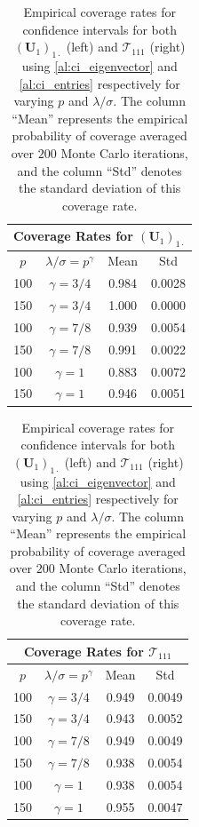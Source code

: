 \documentclass[10pt]{article}
\newcommand{\0}{{\mathbf{0}}}
\newcommand{\1}{{\mathbf{1}}}
\newcommand{\U}{{\mathbf{U}}}
\begin{document}
 \begin{table}[htb]
    \centering
    \begin{tabular}{|c|c | c | c |}
    \hline 
\multicolumn{4}{|c|}{Coverage Rates for $(\U_1)_{1\cdot}$}   \\ [1ex]
\hline 
  $p$ & $ \lambda/\sigma = p^{\gamma}$ & Mean  & Std  \\
  \hline 
  100 & $\gamma = 3/4$ & 0.984 &   0.0028 
\\ 
\hline 
  
 150 & $\gamma =  3/4$ &  1.000  & 0.0000 
 \\
\hline 
  
 100 & $\gamma = 7/8$ & 0.939   & 0.0054 
\\
\hline 
  
 150 & $\gamma = 7/8$ & 0.991
  &   0.0022
 \\
 \hline 
  
 100  & $\gamma = 1$ &  0.883 
&  0.0072 
\\\hline 
  
 150  & $\gamma =  1$ & 0.946  & 0.0051
\\ \hline 
  
\end{tabular} 
\hspace{20pt}
\begin{tabular}{|c|c | c | c |}
      \hline 
\multicolumn{4}{|c|}{Coverage Rates for $\mathcal{T}_{111}$}   \\ [1ex]
\hline 
  $p$ & $ \lambda/\sigma = p^{\gamma}$ & Mean  & Std  \\
  \hline 
  100 & $\gamma = 3/4$ & 0.949 &  0.0049 
\\ 
\hline 
  
 150 & $\gamma =  3/4$ &  0.943 &   0.0052 
\\
\hline 
  
 100 & $\gamma = 7/8$ & 0.949   & 0.0049
\\
\hline 
  
 150 & $\gamma = 7/8$ &0.938 &  0.0054 
 \\
 \hline 
  
 100  & $\gamma = 1$ & 0.938 & 0.0054
\\\hline 
  
 150  & $\gamma =  1$ &0.955 &   0.0047
\\ \hline 
  
\end{tabular}
    \caption{Empirical coverage rates for confidence intervals for both  $(\U_1)_{1\cdot}$ (left) and $\mathcal{T}_{111}$ (right) using \cref{al:ci_eigenvector} and \cref{al:ci_entries} respectively for varying $p$ and $\lambda/\sigma$.   The column ``Mean'' represents the empirical probability of coverage averaged over $200$ Monte Carlo iterations, and the column ``Std'' denotes the standard deviation of this coverage rate.}
    \label{fig:coveragerates}
\end{table}
 
\end{document}
